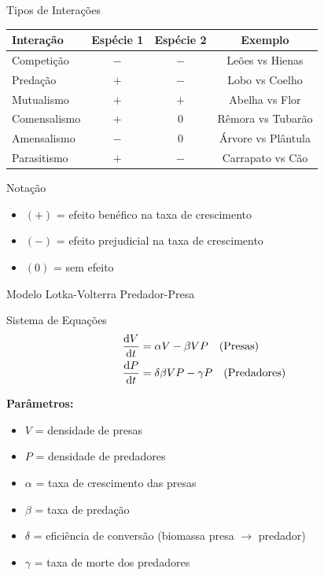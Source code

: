 \begin{frame}{Tipos de Interações}
\begin{center}
\begin{tabular}{lccc}
\toprule
\textbf{Interação} & \textbf{Espécie 1} & \textbf{Espécie 2} & \textbf{Exemplo} \\
\midrule
Competição & $-$ & $-$ & Leões vs Hienas \\
Predação & $+$ & $-$ & Lobo vs Coelho \\
Mutualismo & $+$ & $+$ & Abelha vs Flor \\
Comensalismo & $+$ & $0$ & Rêmora vs Tubarão \\
Amensalismo & $-$ & $0$ & Árvore vs Plântula \\
Parasitismo & $+$ & $-$ & Carrapato vs Cão \\
\bottomrule
\end{tabular}
\end{center}

\vspace{0.3cm}

\begin{exampleblock}{Notação}
\begin{itemize}
    \item $(+)$ = efeito benéfico na taxa de crescimento
    \item $(-)$ = efeito prejudicial na taxa de crescimento
    \item $(0)$ = sem efeito
\end{itemize}
\end{exampleblock}
\end{frame}

\begin{frame}{Modelo Lotka-Volterra Predador-Presa}
\begin{block}{Sistema de Equações}
\begin{align*}
\frac{\mathrm{d} V}{\mathrm{d} t} &= \alpha V - \beta V P \quad \text{(Presas)}\\
\frac{\mathrm{d} P}{\mathrm{d} t} &= \delta \beta V P - \gamma P \quad \text{(Predadores)}
\end{align*}

\textbf{Parâmetros:}
\begin{itemize}
    \item $V$ = densidade de presas
    \item $P$ = densidade de predadores
    \item $\alpha$ = taxa de crescimento das presas
    \item $\beta$ = taxa de predação
    \item $\delta$ = eficiência de conversão (biomassa presa $\to$ predador)
    \item $\gamma$ = taxa de morte dos predadores
\end{itemize}
\end{block}
\end{frame}

